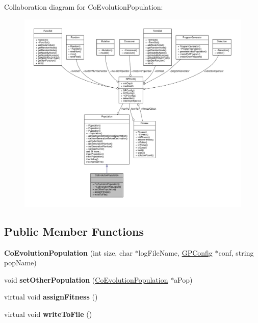Collaboration diagram for Co\+Evolution\+Population\+:
\nopagebreak
\begin{figure}[H]
\begin{center}
\leavevmode
\includegraphics[width=350pt]{classCoEvolutionPopulation__coll__graph}
\end{center}
\end{figure}
\subsection*{Public Member Functions}
\begin{DoxyCompactItemize}
\item 
\hypertarget{classCoEvolutionPopulation_ae210feaa477d553c4bec4da4653cb863}{}\label{classCoEvolutionPopulation_ae210feaa477d553c4bec4da4653cb863} 
{\bfseries Co\+Evolution\+Population} (int size, char $\ast$log\+File\+Name, \hyperlink{classGPConfig}{G\+P\+Config} $\ast$conf, string pop\+Name)
\item 
\hypertarget{classCoEvolutionPopulation_a1b97173c538bca3a81a2617390dbe945}{}\label{classCoEvolutionPopulation_a1b97173c538bca3a81a2617390dbe945} 
void {\bfseries set\+Other\+Population} (\hyperlink{classCoEvolutionPopulation}{Co\+Evolution\+Population} $\ast$a\+Pop)
\item 
\hypertarget{classCoEvolutionPopulation_a40438230270750a7b0176e15845783ff}{}\label{classCoEvolutionPopulation_a40438230270750a7b0176e15845783ff} 
virtual void {\bfseries assign\+Fitness} ()
\item 
\hypertarget{classCoEvolutionPopulation_a827497c1c069d5d3cb4ad1aa8674a20a}{}\label{classCoEvolutionPopulation_a827497c1c069d5d3cb4ad1aa8674a20a} 
virtual void {\bfseries write\+To\+File} ()
\end{DoxyCompactItemize}
